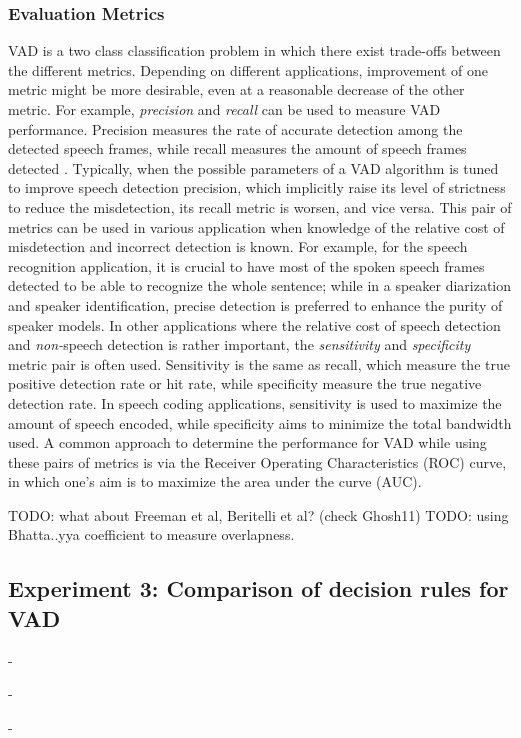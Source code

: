 \subsubsection{Evaluation Metrics}
VAD is a two class classification problem in which there exist trade-offs between the different metrics. Depending on different applications, improvement of one metric might be more desirable, even at a reasonable decrease of the other metric. For example, \emph{precision} and \emph{recall} can be used to measure VAD performance. Precision measures the rate of accurate detection among the detected speech frames, while recall measures the amount of speech frames detected \cite{}. Typically, when the possible parameters of a VAD algorithm is tuned to improve speech detection precision, which implicitly raise its level of strictness to reduce the misdetection, its recall metric  is worsen, and vice versa. This pair of metrics can be used in various application when knowledge of the relative cost of misdetection and incorrect detection is known. For example, for the speech recognition application, it is crucial to have most of the spoken speech frames detected to be able to recognize the whole sentence; while in a speaker diarization and speaker identification, precise detection is preferred to enhance the purity of speaker models. In other applications where the relative cost of speech detection and \emph{non-}speech detection is rather important, the \emph{sensitivity} and \emph{specificity} metric pair is often used. Sensitivity is the same as recall, which measure the true positive detection rate or hit rate, while specificity measure the true negative detection rate. In speech coding applications, sensitivity is used to maximize the amount of speech encoded, while specificity aims to minimize the total bandwidth used.
A common approach to determine the performance for VAD while using these pairs of metrics is via the Receiver Operating Characteristics (ROC) curve, in which one's aim is to maximize the area under the curve (AUC).

TODO: what about Freeman et al, Beritelli et al? (check Ghosh11)
TODO: using Bhatta..yya coefficient to measure overlapness.

\subsection{Experiment 3: Comparison of decision rules for VAD}
-

-

-


